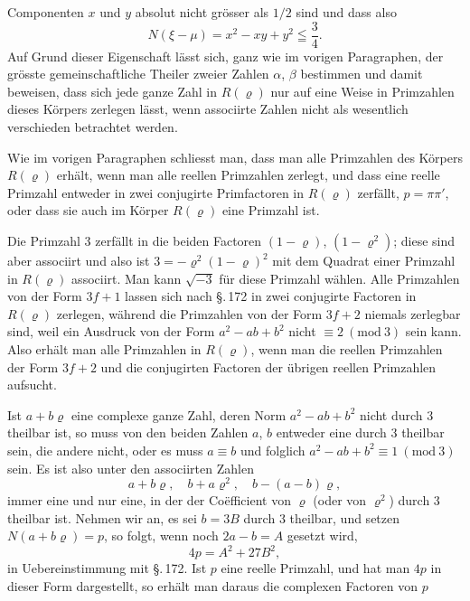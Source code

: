Componenten $x$ und $y$ absolut nicht gr\"osser als $1/2$ sind und dass also
\[
N(\xi-\mu) = x^2 - xy + y^2 \leqq \frac{3}{4}.
\]
Auf Grund dieser Eigenschaft l\"asst sich, ganz wie im vorigen Paragraphen, der gr\"osste gemeinschaftliche Theiler zweier Zahlen $\alpha$, $\beta$ bestimmen und damit beweisen, dass sich jede ganze Zahl in $R(\varrho)$ nur auf eine Weise in Primzahlen dieses K\"orpers zerlegen l\"asst, wenn associirte Zahlen nicht als wesentlich verschieden betrachtet werden.

Wie im vorigen Paragraphen schliesst man, dass man alle Primzahlen des K\"orpers $R(\varrho)$ erh\"alt, wenn man alle reellen Primzahlen zerlegt, und dass eine reelle Primzahl entweder in zwei conjugirte Primfactoren in $R(\varrho)$ zerf\"allt, $p=\pi\pi'$, oder dass sie auch im K\"orper $R(\varrho)$ eine Primzahl ist.

Die Primzahl 3 zerf\"allt in die beiden Factoren $(1-\varrho)$, $(1-\varrho^2)$; diese sind aber associirt und also ist $3=-\varrho^2(1-\varrho)^2$ mit dem Quadrat einer Primzahl in $R(\varrho)$ associirt. Man kann $\sqrt{-3}$ f\"ur diese Primzahl w\"ahlen. Alle Primzahlen von der Form $3f+1$ lassen sich nach \S.\,172 in zwei conjugirte Factoren in $R(\varrho)$ zerlegen, w\"ahrend die Primzahlen von der Form $3f+2$ niemals zerlegbar sind, weil ein Ausdruck von der Form $a^2-ab+b^2$ nicht $\equiv 2\ (\mathrm{mod}\ 3)$ sein kann. Also erh\"alt man alle Primzahlen in $R(\varrho)$, wenn man die reellen Primzahlen der Form $3f+2$ und die conjugirten Factoren der \"ubrigen reellen Primzahlen aufsucht.

Ist $a+b\varrho$ eine complexe ganze Zahl, deren Norm $a^2-ab+b^2$ nicht durch 3 theilbar ist, so muss von den beiden Zahlen $a$, $b$ entweder eine durch 3 theilbar sein, die andere nicht, oder es muss $a\equiv b$ und folglich $a^2-ab+b^2\equiv 1\ (\mathrm{mod}\ 3)$ sein. Es ist also unter den associirten Zahlen
\[
a+b\varrho,\quad b+a\varrho^2,\quad b-(a-b)\varrho,
\]
immer eine und nur eine, in der der Co\"efficient von $\varrho$ (oder von $\varrho^2$) durch 3 theilbar ist. Nehmen wir an, es sei $b=3B$ durch 3 theilbar, und setzen $N(a+b\varrho)=p$, so folgt, wenn noch $2a-b=A$ gesetzt wird,
\[
4p = A^2 + 27B^2,
\]
in Uebereinstimmung mit \S.\,172. Ist $p$ eine reelle Primzahl, und hat man $4p$ in dieser Form dargestellt, so erh\"alt man daraus die complexen Factoren von $p$
